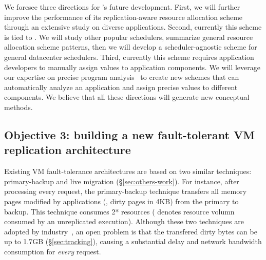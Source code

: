 
 We foresee three directions for \tripod's future 
development. First, we will further improve the performance of its 
replication-aware resource allocation scheme through an extensive study on 
diverse applications. Second, currently this scheme is tied to \mesos. We will 
study other popular schedulers, summarize general resource allocation scheme 
patterns, then we will develop a scheduler-agnostic scheme for general 
datacenter schedulers. Third, currently this scheme requires application 
developers to manually assign  values to application components. We will 
leverage our expertise on precise 
program analysis~\cite{peregrine:sosp11,woodpecker:asplos13} to create new 
schemes that can automatically analyze an application and assign precise  
values to different components. We believe that all these directions will 
generate new conceptual methods.

\vspace{-.15in}\subsection{Objective 3: building a new fault-tolerant VM 
replication architecture}\label{sec:vm}\vspace{-.075in}



Existing VM fault-tolerance architectures are based on two similar 
techniques: primary-backup and live migration (\S\ref{sec:others-work}). For 
instance, after processing every request, the primary-backup technique 
transfers all memory pages modified by applications (\ie, dirty pages in 4KB) 
from the primary to backup. This technique consumes 2* resources ( 
denotes resource volumn consumed by an unreplicated execution). Although 
these two techniques are adopted by industry~\cite{ftvm}, an open problem is 
that the transfered dirty bytes can be up to 1.7GB (\S\ref{sec:tracking}), 
causing a substantial  delay and network bandwidth consumption for \emph{every} 
request.

